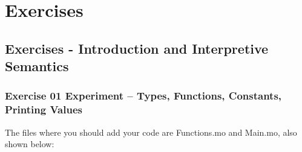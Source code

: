 \documentclass[10.5pt,a4]{article}
\begin{document}
\begin{comment}
\subsection{Petrol Main.mo}


\subsection{Petrol Parse.mo}


\lstset{language=}
\subsection{Petrol lexerPetrol.c}


\subsection{Petrol lexerPetrol.h}


\subsection{Petrol parser.y}


\subsection{Petrol Makefile}

\lstset{language=modelica}
\end{comment}

\section{Exercises}

\subsection{Exercises - Introduction and Interpretive Semantics}

\subsubsection{Exercise 01 Experiment – Types, Functions, Constants, Printing Values}


The files where you should add your code are Functions.mo and Main.mo, also shown below:


\end{document}
